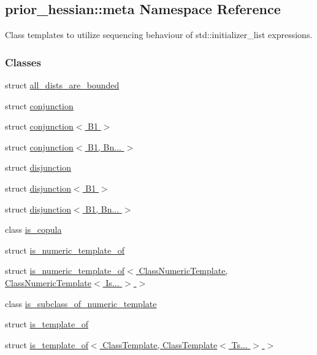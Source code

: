 \hypertarget{namespaceprior__hessian_1_1meta}{}\subsection{prior\+\_\+hessian\+:\+:meta Namespace Reference}
\label{namespaceprior__hessian_1_1meta}


Class templates to utilize sequencing behaviour of std\+::initializer\+\_\+list expressions.  


\subsubsection*{Classes}
\begin{DoxyCompactItemize}
\item 
struct \hyperlink{structprior__hessian_1_1meta_1_1all__dists__are__bounded}{all\+\_\+dists\+\_\+are\+\_\+bounded}
\item 
struct \hyperlink{structprior__hessian_1_1meta_1_1conjunction}{conjunction}
\item 
struct \hyperlink{structprior__hessian_1_1meta_1_1conjunction_3_01B1_01_4}{conjunction$<$ B1 $>$}
\item 
struct \hyperlink{structprior__hessian_1_1meta_1_1conjunction_3_01B1_00_01Bn_8_8_8_01_4}{conjunction$<$ B1, Bn... $>$}
\item 
struct \hyperlink{structprior__hessian_1_1meta_1_1disjunction}{disjunction}
\item 
struct \hyperlink{structprior__hessian_1_1meta_1_1disjunction_3_01B1_01_4}{disjunction$<$ B1 $>$}
\item 
struct \hyperlink{structprior__hessian_1_1meta_1_1disjunction_3_01B1_00_01Bn_8_8_8_01_4}{disjunction$<$ B1, Bn... $>$}
\item 
class \hyperlink{classprior__hessian_1_1meta_1_1is__copula}{is\+\_\+copula}
\item 
struct \hyperlink{structprior__hessian_1_1meta_1_1is__numeric__template__of}{is\+\_\+numeric\+\_\+template\+\_\+of}
\item 
struct \hyperlink{structprior__hessian_1_1meta_1_1is__numeric__template__of_3_01ClassNumericTemplate_00_01ClassNum9ff24e61e3d3187d075a4a72dee66cb3}{is\+\_\+numeric\+\_\+template\+\_\+of$<$ Class\+Numeric\+Template, Class\+Numeric\+Template$<$ Is... $>$ $>$}
\item 
class \hyperlink{classprior__hessian_1_1meta_1_1is__subclass__of__numeric__template}{is\+\_\+subclass\+\_\+of\+\_\+numeric\+\_\+template}
\item 
struct \hyperlink{structprior__hessian_1_1meta_1_1is__template__of}{is\+\_\+template\+\_\+of}
\item 
struct \hyperlink{structprior__hessian_1_1meta_1_1is__template__of_3_01ClassTemplate_00_01ClassTemplate_3_01Ts_8_8_8_01_4_01_4}{is\+\_\+template\+\_\+of$<$ Class\+Template, Class\+Template$<$ Ts... $>$ $>$}
\end{DoxyCompactItemize}
